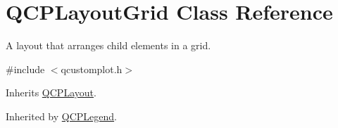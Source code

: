 \hypertarget{class_q_c_p_layout_grid}{\section{Q\-C\-P\-Layout\-Grid Class Reference}
\label{class_q_c_p_layout_grid}
}


A layout that arranges child elements in a grid.  




{\ttfamily \#include $<$qcustomplot.\-h$>$}



Inherits \hyperlink{class_q_c_p_layout}{Q\-C\-P\-Layout}.



Inherited by \hyperlink{class_q_c_p_legend}{Q\-C\-P\-Legend}.

